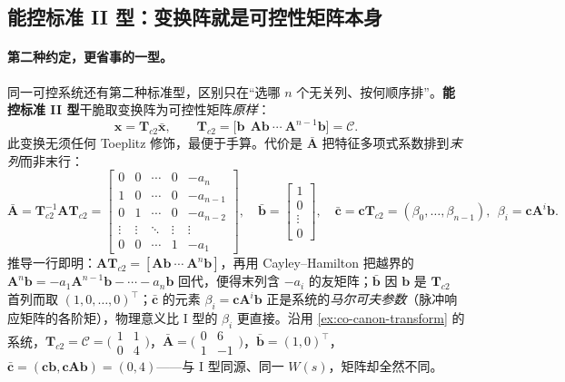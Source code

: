 \subsection{能控标准 II 型：变换阵就是可控性矩阵本身}
\label{sec:co-canon-II}

\paragraph{第二种约定，更省事的一型。}
同一可控系统还有第二种标准型，区别只在“选哪 $n$ 个无关列、按何顺序排”。\textbf{能控标准 II 型}干脆取变换阵为可控性矩阵\emph{原样}\cite{liubao2006modern}：
\begin{equation}
  \mathbf{x}=\mathbf{T}_{c2}\bar{\mathbf{x}},\qquad
  \mathbf{T}_{c2}=\big[\mathbf{b}\ \ \mathbf{A}\mathbf{b}\ \cdots\ \mathbf{A}^{n-1}\mathbf{b}\big]=\mathcal{C}.
  \label{eq:co-tc2}
\end{equation}
此变换无须任何 Toeplitz 修饰，最便于手算。代价是 $\bar{\mathbf{A}}$ 把特征多项式系数排到\emph{末列}而非末行：
\begin{equation}
  \bar{\mathbf{A}}=\mathbf{T}_{c2}^{-1}\mathbf{A}\mathbf{T}_{c2}=\begin{bmatrix}
    0&0&\cdots&0&-a_n\\
    1&0&\cdots&0&-a_{n-1}\\
    0&1&\cdots&0&-a_{n-2}\\
    \vdots&\vdots&\ddots&\vdots&\vdots\\
    0&0&\cdots&1&-a_1
  \end{bmatrix},\quad
  \bar{\mathbf{b}}=\begin{bmatrix}1\\0\\\vdots\\0\end{bmatrix},\quad
  \bar{\mathbf{c}}=\mathbf{c}\mathbf{T}_{c2}=(\beta_0,\dots,\beta_{n-1}),\ \ \beta_i=\mathbf{c}\mathbf{A}^i\mathbf{b}.
  \label{eq:co-tc2-form}
\end{equation}
推导一行即明：$\mathbf{A}\mathbf{T}_{c2}=[\mathbf{A}\mathbf{b}\ \cdots\ \mathbf{A}^{n}\mathbf{b}]$，再用 Cayley--Hamilton 把越界的 $\mathbf{A}^{n}\mathbf{b}=-a_1\mathbf{A}^{n-1}\mathbf{b}-\cdots-a_n\mathbf{b}$ 回代，便得末列含 $-a_i$ 的友矩阵；$\bar{\mathbf{b}}$ 因 $\mathbf{b}$ 是 $\mathbf{T}_{c2}$ 首列而取 $(1,0,\dots,0)^\top$；$\bar{\mathbf{c}}$ 的元素 $\beta_i=\mathbf{c}\mathbf{A}^i\mathbf{b}$ 正是系统的\emph{马尔可夫参数}（脉冲响应矩阵的各阶矩），物理意义比 I 型的 $\beta_i$ 更直接\cite{liubao2006modern}。沿用 \cref{ex:co-canon-transform} 的系统，$\mathbf{T}_{c2}=\mathcal{C}=\big(\begin{smallmatrix}1&1\\0&4\end{smallmatrix}\big)$，$\bar{\mathbf{A}}=\big(\begin{smallmatrix}0&6\\1&-1\end{smallmatrix}\big)$，$\bar{\mathbf{b}}=(1,0)^\top$，$\bar{\mathbf{c}}=(\mathbf{c}\mathbf{b},\mathbf{c}\mathbf{A}\mathbf{b})=(0,4)$——与 I 型同源、同一 $W(s)$，矩阵却全然不同。

